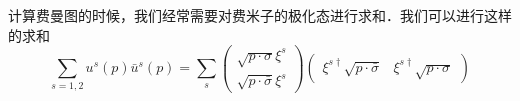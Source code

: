 
计算费曼图的时候，我们经常需要对费米子的极化态进行求和．我们可以进行这样的求和
\begin{equation}
\sum_{s = 1,2}u^s(p)\bar u^s(p )= \sum_s \begin{pmatrix}
\sqrt{p\cdot \sigma}\xi^s \\
\sqrt{p\cdot\bar\sigma} \xi^s
\end{pmatrix}\begin{pmatrix}
\xi^{s\dagger}\sqrt{p\cdot\bar\sigma} & \xi^{s\dagger}\sqrt{p\cdot \sigma}
\end{pmatrix}
\end{equation}